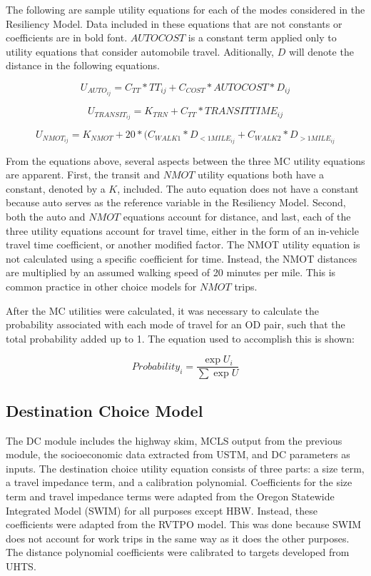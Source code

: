 The following are sample utility equations for each of the modes considered in the Resiliency Model. Data included in these equations that are not constants or coefficients are in bold font. $AUTOCOST$ is a constant term applied only to utility equations that consider automobile travel. Aditionally, $D$ will denote the distance in the following equations.

\begin{equation}
U_{{AUTO}_{ij}} = C_{TT} * TT_{ij} + C_{COST} * AUTOCOST * D_{ij}
	\label{eqn:auto}
\end{equation}

\begin{equation}
U_{{TRANSIT}_{ij}} = K_{TRN} + C_{TT} * TRANSIT TIME_{ij}
	\label{eqn:transit}
\end{equation}

\begin{equation}
U_{{NMOT}_{ij}} = K_{NMOT} + 20 * (C_{WALK1} * D_{{<1MILE}_{ij}} + C_{WALK2} * D_{{>1MILE}_{ij}}
	\label{eqn:nmot}
\end{equation}

From the equations above, several aspects between the three MC utility equations are
apparent. First, the transit and $NMOT$ utility equations both have a constant, denoted by a $K$,
included. The auto equation does not have a constant because auto serves as the reference
variable in the Resiliency Model. Second, both the auto and $NMOT$ equations account for
distance, and last, each of the three utility equations account for travel time, either in the
form of an in-vehicle travel time coefficient, or another modified factor. The NMOT utility
equation is not calculated using a specific coefficient for time. Instead, the NMOT distances are
multiplied by an assumed walking speed of 20 minutes per mile. This is common practice in other
choice models for $NMOT$ trips.

After the MC utilities were calculated, it was necessary to calculate the probability associated
with each mode of travel for an OD pair, such that the total probability added
up to 1. The equation used to accomplish this is shown:

\begin{equation}
	Probability_i = \frac{\exp U_i}{\sum \exp U}
	\label{eqn:prob}
\end{equation}

\subsection{Destination Choice Model}
The DC module
includes the highway skim, MCLS output from the previous module, the socioeconomic data extracted
from USTM, and DC parameters as inputs.
The destination choice utility equation consists of three parts: a size term,
a travel impedance term, and a calibration polynomial. Coefficients for the
size term and travel impedance terms were adapted from the Oregon
Statewide Integrated Model (SWIM) for all purposes except HBW. Instead, these coefficients were
adapted from the RVTPO model. This was done because SWIM does not account for work trips in the same way as it does the other purposes. The distance polynomial coefficients were
calibrated to targets developed from UHTS.

